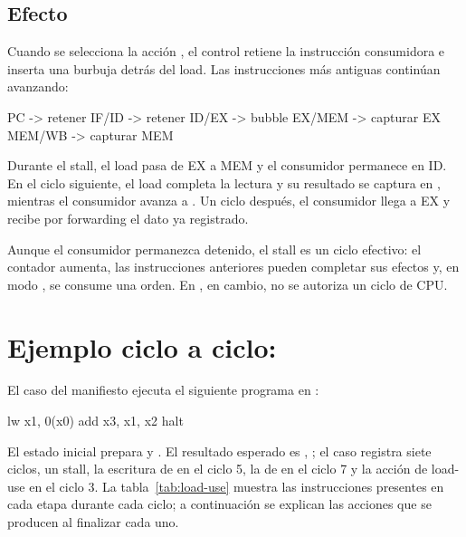 \subsection{Efecto}

Cuando se selecciona la acción , el control retiene la
instrucción consumidora e inserta una burbuja detrás del load. Las instrucciones
más antiguas continúan avanzando:

\begin{codebox}
PC       -> retener
IF/ID    -> retener
ID/EX    -> bubble
EX/MEM   -> capturar EX
MEM/WB   -> capturar MEM
\end{codebox}

Durante el stall, el load pasa de EX a MEM y el consumidor permanece en ID. En
el ciclo siguiente, el load completa la lectura y su resultado se captura en
, mientras el consumidor avanza a . Un ciclo después,
el consumidor llega a EX y recibe por forwarding el dato ya registrado.

Aunque el consumidor permanezca detenido, el stall es un ciclo efectivo: el
contador aumenta, las instrucciones anteriores pueden completar sus efectos y,
en modo , se consume una orden. En , en cambio, no se
autoriza un ciclo de CPU.

\section{Ejemplo ciclo a ciclo: \texorpdfstring{}{TEST-PIPE-005/C001}}

El caso  del manifiesto ejecuta el siguiente programa
en :

\begin{codebox}[language=RISCV]
lw   x1, 0(x0)
add  x3, x1, x2
halt
\end{codebox}

El estado inicial prepara  y . El resultado
esperado es , ; el caso registra siete ciclos, un
stall, la escritura de  en el ciclo 5, la de  en el ciclo 7 y
la acción de load-use en el ciclo 3. La tabla~\ref{tab:load-use} muestra las
instrucciones presentes en cada etapa durante cada ciclo; a continuación se
explican las acciones que se producen al finalizar cada uno.

